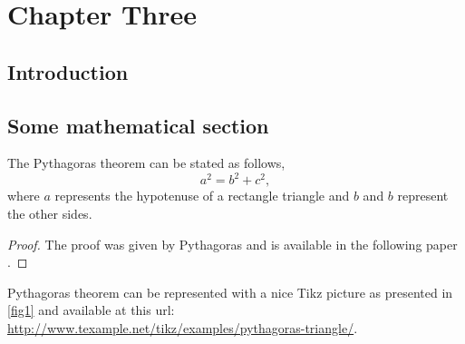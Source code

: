 \chapter{Chapter Three}
\label{Chap3}

\section{Introduction}

\blindtext[5]

\section{Some mathematical section}

\begin{theorem}
The Pythagoras theorem can be stated as follows,
\begin{equation}
a^{2} = b^2 + c^{2}, 
\end{equation}
where $a$ represents the hypotenuse of a rectangle triangle and $b$ and $b$ represent the other sides.
\end{theorem}

\begin{proof}
The proof was given by Pythagoras and is available in the following paper \citep{Veljan2000}.
\end{proof}

Pythagoras theorem can be represented with a nice Tikz picture as presented in \ref{fig1} and available at this url: \\
\url{http://www.texample.net/tikz/examples/pythagoras-triangle/}.

